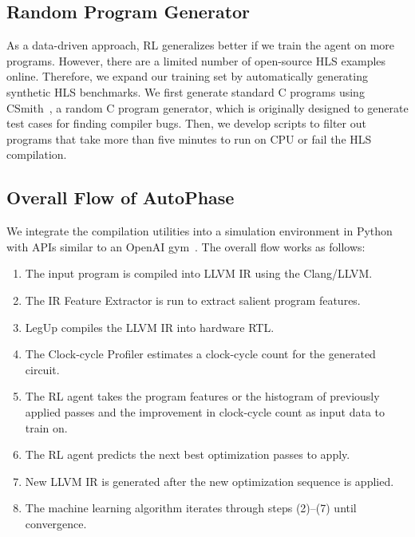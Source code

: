 \subsection{Random Program Generator}
As a data-driven approach, RL generalizes better if we train the agent on more programs.
However, there are a limited number of open-source HLS examples online. Therefore, we expand our training set by automatically generating synthetic HLS benchmarks. We first generate standard C programs using CSmith~\cite{yang2011csmith}, a random C program generator, which is originally designed to generate test cases for finding compiler bugs. Then, we develop scripts to filter out programs that take more than five minutes to run on CPU or fail the HLS compilation. 

\subsection{Overall Flow of AutoPhase}
We integrate the compilation utilities into a simulation environment in Python with APIs similar to an OpenAI gym~\cite{brockman2016openai}.
The overall flow works as follows:
\begin{enumerate}
\itemsep 0em 
\item The input program is compiled into LLVM IR using the Clang/LLVM. 
\item The IR Feature Extractor is run to extract salient program features. 
\item LegUp compiles the LLVM IR into hardware RTL.
\item The Clock-cycle Profiler estimates a clock-cycle count for the generated circuit. 
\item The RL agent takes the program features or the histogram of previously applied passes and the improvement in clock-cycle count as input data to train on. 
\item The RL agent predicts the next best optimization passes to apply. 
\item New LLVM IR is generated after the new optimization sequence is applied. 
\item The machine learning algorithm iterates through steps (2)--(7) until convergence.
\end{enumerate}
